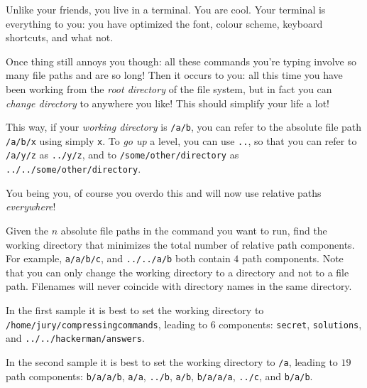 





Unlike your friends, you live in a terminal. You are cool. Your terminal is
everything to you: you have optimized the font, colour scheme, keyboard
shortcuts, and what not.

Once thing still annoys you though: all these commands you're typing involve so
many file paths and are so long! Then it occurs to you: all this time you have
been working from the \emph{root directory} of the file system, but in fact you
can \emph{change directory} to anywhere you like! This should simplify your life
a lot!

This way, if your \emph{working directory} is \texttt{/a/b}, you can refer to
the absolute file path \texttt{/a/b/x} using simply \texttt{x}. To \emph{go up} a
level, you can use \texttt{..}, so that you can refer to \texttt{/a/y/z}
as \texttt{../y/z}, and to \texttt{/some/other/directory} as \texttt{../../some/other/directory}.

You being you, of course you overdo this and will now use relative
paths \emph{everywhere}!

Given the $n$ absolute file paths in the command you want to run, find the
working directory that minimizes the total number of relative path components.
For example, \texttt{a/a/b/c}, and \texttt{../../a/b} both contain $4$ path components.
Note that you can only change the working directory to a directory and not to a file path.
Filenames will never coincide with directory names in the same directory.

In the first sample it is best to set the working directory
to \texttt{/home/jury/compressingcommands}, leading to $6$
components: \texttt{secret}, \texttt{solutions},
and \texttt{../../hackerman/answers}.

In the second sample it is best to set the working directory to \texttt{/a},
leading to $19$ path components: \texttt{b/a/a/b}, \texttt{a/a}, \texttt{../b}, \texttt{a/b}, \texttt{b/a/a/a}, \texttt{../c}, and \texttt{b/a/b}.

